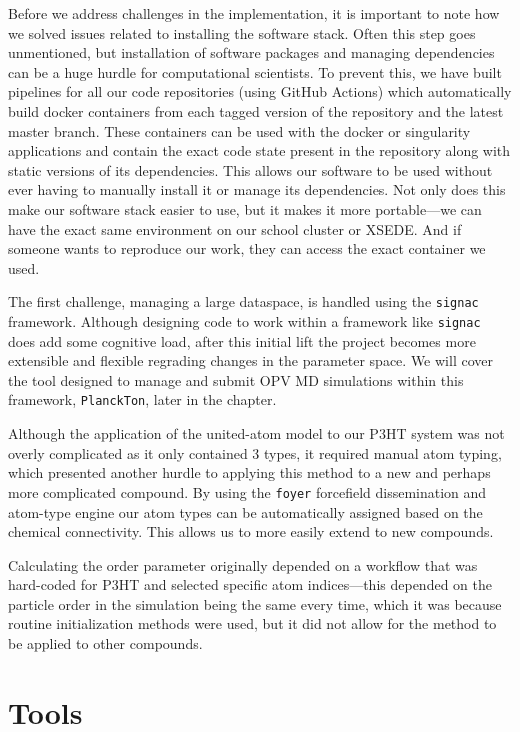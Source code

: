 Before we address challenges in the implementation, it is important to note how we solved issues related to installing the software stack.
Often this step goes unmentioned, but installation of software packages and managing dependencies can be a huge hurdle for computational scientists. 
To prevent this, we have built pipelines for all our code repositories (using GitHub Actions) which automatically build docker containers from each tagged version of the repository and the latest master branch. 
These containers can be used with the docker or singularity applications and contain the exact code state present in the repository along with static versions of its dependencies.
This allows our software to be used without ever having to manually install it or manage its dependencies. 
Not only does this make our software stack easier to use, but it makes it more portable---we can have the exact same environment on our school cluster or XSEDE.
And if someone wants to reproduce our work, they can access the exact container we used.

The first challenge, managing a large dataspace, is handled using the \texttt{signac} framework. Although designing code to work within a framework like \texttt{signac} does add some cognitive load, after this initial lift the project becomes more extensible and flexible regrading changes in the parameter space. We will cover the tool designed to manage and submit OPV MD simulations within this framework, \texttt{PlanckTon}, later in the chapter.

Although the application of the united-atom model to our P3HT system was not overly complicated as it only contained 3 types, it required manual atom typing, which presented another hurdle to applying this method to a new and perhaps more complicated compound. 
By using the \texttt{foyer} forcefield dissemination and atom-type engine \cite{foyer} our atom types can be automatically assigned based on the chemical connectivity. This allows us to more easily extend to new compounds.

Calculating the order parameter originally depended on a workflow that was hard-coded for P3HT and selected specific atom indices---this depended on the particle order in the simulation being the same every time, which it was because routine initialization methods were used, but it did not allow for the method to be applied to other compounds.

\section{Tools}

